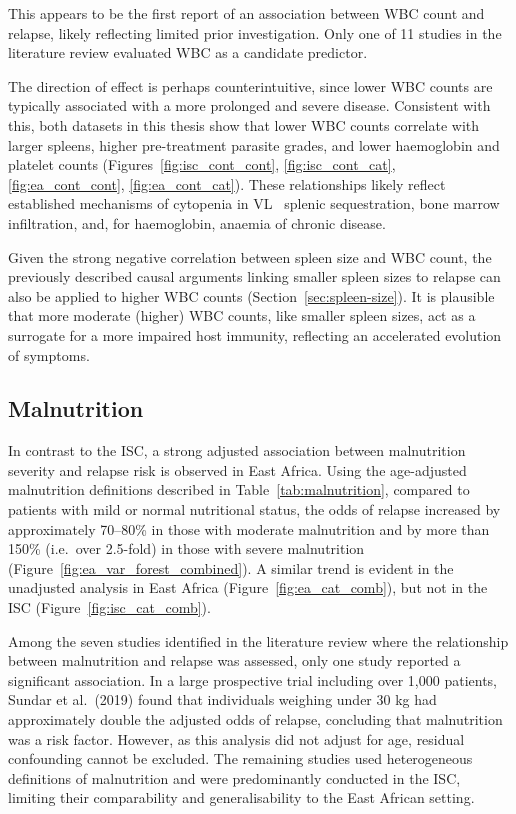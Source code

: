 This appears to be the first report of an association between WBC count and relapse, likely reflecting limited prior investigation. Only one of 11 studies in the literature review evaluated WBC as a candidate predictor\cite{kajaia2011}.

The direction of effect is perhaps counterintuitive, since lower WBC counts are typically associated with a more prolonged and severe disease\cite{pareyn2025,burza2018}. Consistent with this, both datasets in this thesis show that lower WBC counts correlate with larger spleens, higher pre-treatment parasite grades, and lower haemoglobin and platelet counts (Figures~\ref{fig:isc_cont_cont}, \ref{fig:isc_cont_cat}, \ref{fig:ea_cont_cont}, \ref{fig:ea_cont_cat}). These relationships likely reflect established mechanisms of cytopenia in VL \textemdash\ splenic sequestration, bone marrow infiltration, and, for haemoglobin, anaemia of chronic disease\cite{varma2010,shiferaw2021}.

Given the strong negative correlation between spleen size and WBC count, the previously described causal arguments linking smaller spleen sizes to relapse can also be applied to higher WBC counts (Section~\ref{sec:spleen-size}). It is plausible that more moderate (higher) WBC counts, like smaller spleen sizes, act as a surrogate for a more impaired host immunity, reflecting an accelerated evolution of symptoms.

\subsection{Malnutrition}

In contrast to the ISC, a strong adjusted association between malnutrition severity and relapse risk is observed in East Africa. Using the age-adjusted malnutrition definitions described in Table~\ref{tab:malnutrition}, compared to patients with mild or normal nutritional status, the odds of relapse increased by approximately 70--80\% in those with moderate malnutrition and by more than 150\% (i.e.\ over 2.5-fold) in those with severe malnutrition (Figure~\ref{fig:ea_var_forest_combined}). A similar trend is evident in the unadjusted analysis in East Africa (Figure~\ref{fig:ea_cat_comb}), but not in the ISC (Figure~\ref{fig:isc_cat_comb}).

Among the seven studies identified in the literature review where the relationship between malnutrition and relapse was assessed, only one study reported a significant association. In a large prospective trial including over 1,000 patients, Sundar et al.\ (2019) found that individuals weighing under 30 kg had approximately double the adjusted odds of relapse, concluding that malnutrition was a risk factor\cite{sundar2019}. However, as this analysis did not adjust for age, residual confounding cannot be excluded. The remaining studies used heterogeneous definitions of malnutrition and were predominantly conducted in the ISC, limiting their comparability and generalisability to the East African setting.


